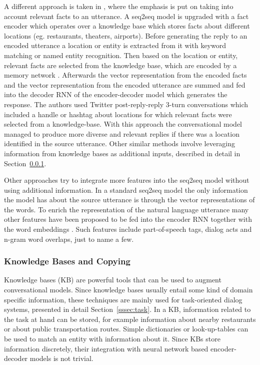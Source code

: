 \documentclass[12pt]{article}
\begin{document}
A different approach is taken in \cite{Ghazvininejad:2017}, where the emphasis is put on taking into account relevant facts to an utterance. A seq2seq model is upgraded with a fact encoder which operates over a knowledge base which stores facts about different locations (eg. restaurants, theaters, airports). Before generating the reply to an encoded utterance a location or entity is extracted from it with keyword matching or named entity recognition. Then based on the location or entity, relevant facts are selected from the knowledge base, which are encoded by a memory network \cite{Sukhbaatar:2015}. Afterwards the vector representation from the encoded facts and the vector representation from the encoded utterance are summed and fed into the decoder RNN of the encoder-decoder model which generates the response. The authors used Twitter post-reply-reply 3-turn conversations which included a handle or hashtag about locations for which relevant facts were selected from a knowledge-base. With this approach the conversational model managed to produce more diverse and relevant replies if there was a location identified in the source utterance. Other similar methods involve leveraging information from knowledge bases as additional inputs, described in detail in Section~\ref{sssec:KB}. 

Other approaches try to integrate more features into the seq2seq model without using additional information. In a standard seq2seq model the only information the model has about the source utterance is through the vector representations of the words. To enrich the representation of the natural language utterance many other features have been proposed to be fed into the encoder RNN together with the word embeddings \cite{Sordoni:2015, Serban_MrRNN:2017,Serban:2017}. Such features include part-of-speech tags, dialog acts and n-gram word overlaps, just to name a few.

\subsubsection{Knowledge Bases and Copying} \label{sssec:KB}
Knowledge bases (KB) are powerful tools that can be used to augment conversational models. Since knowledge bases usually entail some kind of domain specific information, these techniques are mainly used for task-oriented dialog systems, presented in detail Section~\ref{sssec:task}. In a KB, information related to the task at hand can be stored, for example information about nearby restaurants or about public transportation routes. Simple dictionaries or look-up-tables can be used to match an entity with information about it. Since KBs store information discretely, their integration with neural network based encoder-decoder models is not trivial.
\end{document}

